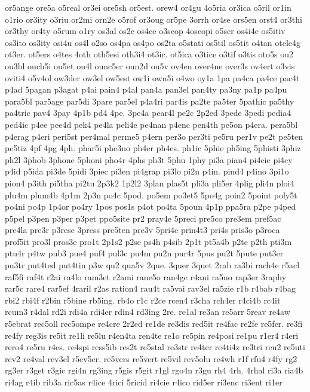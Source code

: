 {or5ange
ore5a
o5real
or3ei
ore5sh
or5est.
orew4
or4gu
4o5ria
or3ica
o5ril
or1in
o1rio
or3ity
o3riu
or2mi
orn2e
o5rof
or3oug
or5pe
3orrh
or4se
ors5en
orst4
or3thi
or3thy
or4ty
o5rum
o1ry
os3al
os2c
os4ce
o3scop
4oscopi
o5scr
os4i4e
os5itiv
os3ito
os3ity
osi4u
os4l
o2so
os4pa
os4po
os2ta
o5stati
os5til
os5tit
o4tan
otele4g
ot3er.
ot5ers
o4tes
4oth
oth5esi
oth3i4
ot3ic.
ot5ica
o3tice
o3tif
o3tis
oto5s
ou2
ou3bl
ouch5i
ou5et
ou4l
ounc5er
oun2d
ou5v
ov4en
over4ne
over3s
ov4ert
o3vis
oviti4
o5v4ol
ow3der
ow3el
ow5est
ow1i
own5i
o4wo
oy1a
1pa
pa4ca
pa4ce
pac4t
p4ad
5pagan
p3agat
p4ai
pain4
p4al
pan4a
pan3el
pan4ty
pa3ny
pa1p
pa4pu
para5bl
par5age
par5di
3pare
par5el
p4a4ri
par4is
pa2te
pa5ter
5pathic
pa5thy
pa4tric
pav4
3pay
4p1b
pd4
4pe.
3pe4a
pear4l
pe2c
2p2ed
3pede
3pedi
pedia4
ped4ic
p4ee
pee4d
pek4
pe4la
peli4e
pe4nan
p4enc
pen4th
pe5on
p4era.
pera5bl
p4erag
p4eri
peri5st
per4mal
perme5
p4ern
per3o
per3ti
pe5ru
per1v
pe2t
pe5ten
pe5tiz
4pf
4pg
4ph.
phar5i
phe3no
ph4er
ph4es.
ph1ic
5phie
ph5ing
5phisti
3phiz
ph2l
3phob
3phone
5phoni
pho4r
4phs
ph3t
5phu
1phy
pi3a
pian4
pi4cie
pi4cy
p4id
p5ida
pi3de
5pidi
3piec
pi3en
pi4grap
pi3lo
pi2n
p4in.
pind4
p4ino
3pi1o
pion4
p3ith
pi5tha
pi2tu
2p3k2
1p2l2
3plan
plas5t
pli3a
pli5er
4plig
pli4n
ploi4
plu4m
plum4b
4p1m
2p3n
po4c
5pod.
po5em
po3et5
5po4g
poin2
5point
poly5t
po4ni
po4p
1p4or
po4ry
1pos
pos1s
p4ot
po4ta
5poun
4p1p
ppa5ra
p2pe
p4ped
p5pel
p3pen
p3per
p3pet
ppo5site
pr2
pray4e
5preci
pre5co
pre3em
pref5ac
pre4la
pre3r
p3rese
3press
pre5ten
pre3v
5pri4e
prin4t3
pri4s
pris3o
p3roca
prof5it
pro3l
pros3e
pro1t
2p1s2
p2se
ps4h
p4sib
2p1t
pt5a4b
p2te
p2th
pti3m
ptu4r
p4tw
pub3
pue4
puf4
pul3c
pu4m
pu2n
pur4r
5pus
pu2t
5pute
put3er
pu3tr
put4ted
put4tin
p3w
qu2
qua5v
2que.
3quer
3quet
2rab
ra3bi
rach4e
r5acl
raf5fi
raf4t
r2ai
ra4lo
ram3et
r2ami
rane5o
ran4ge
r4ani
ra5no
rap3er
3raphy
rar5c
rare4
rar5ef
4raril
r2as
ration4
rau4t
ra5vai
rav3el
ra5zie
r1b
r4bab
r4bag
rbi2
rbi4f
r2bin
r5bine
rb5ing.
rb4o
r1c
r2ce
rcen4
r3cha
rch4er
r4ci4b
rc4it
rcum3
r4dal
rd2i
rdi4a
rdi4er
rdin4
rd3ing
2re.
re1al
re3an
re5arr
5reav
re4aw
r5ebrat
rec5oll
rec5ompe
re4cre
2r2ed
re1de
re3dis
red5it
re4fac
re2fe
re5fer.
re3fi
re4fy
reg3is
re5it
re1li
re5lu
r4en4ta
ren4te
re1o
re5pin
re4posi
re1pu
r1er4
r4eri
rero4
re5ru
r4es.
re4spi
ress5ib
res2t
re5stal
re3str
re4ter
re4ti4z
re3tri
reu2
re5uti
rev2
re4val
rev3el
r5ev5er.
re5vers
re5vert
re5vil
rev5olu
re4wh
r1f
rfu4
r4fy
rg2
rg3er
r3get
r3gic
rgi4n
rg3ing
r5gis
r5git
r1gl
rgo4n
r3gu
rh4
4rh.
4rhal
ri3a
ria4b
ri4ag
r4ib
rib3a
ric5as
r4ice
4rici
5ricid
ri4cie
r4ico
rid5er
ri3enc
ri3ent
ri1er
}
